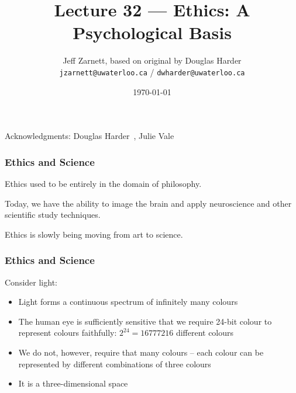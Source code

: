 

\title{Lecture 32 --- Ethics: A Psychological Basis }

\author{Jeff Zarnett, based on original by Douglas Harder \\ \small \texttt{jzarnett@uwaterloo.ca} / \texttt{dwharder@uwaterloo.ca}}
\date{\today}




\begin{frame}
  \titlepage

\begin{center}
  \small{Acknowledgments: Douglas Harder~\cite{dwh}, Julie Vale~\cite{jv}}
  \end{center}
\end{frame}




\begin{frame}
\frametitle{Ethics and Science}

Ethics used to be entirely in the domain of philosophy.

Today, we have the ability to image the brain and apply neuroscience and other scientific study techniques. 

Ethics is slowly being moving from art to science.

\end{frame}



\begin{frame}
\frametitle{Ethics and Science}

Consider light:
\begin{itemize}
\item Light forms a continuous spectrum of infinitely many colours
\item The human eye is sufficiently sensitive that we require 24-bit colour to represent colours faithfully:  $2^{24} = 16 777 216$ different colours
\item We do not, however, require that many colours -- each colour can be represented by different combinations of three colours
\item It is a three-dimensional space
\end{itemize}


\end{frame}



